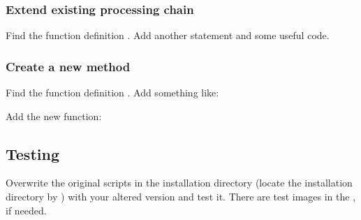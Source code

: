 \documentclass[letterpaper,10pt,english]{sphinxmanual}
\begin{document}
\subsubsection{Extend existing processing chain}
\label{\detokenize{usage:extend-existing-processing-chain}}
Find the function definition . Add another  statement and some useful code.


\subsubsection{Create a new method}
\label{\detokenize{usage:create-a-new-method}}
Find the function definition . Add something like:

\begin{sphinxVerbatim}[commandchars=\\\{\}]
                    
\end{sphinxVerbatim}

Add the new function:

\begin{sphinxVerbatim}[commandchars=\\\{\}]
 
\end{sphinxVerbatim}


\subsection{Testing}
\label{\detokenize{usage:testing}}
Overwrite the original scripts in the installation directory (locate the installation directory by ) with your altered version and test it. There are test images in the , if needed.
\end{document}
